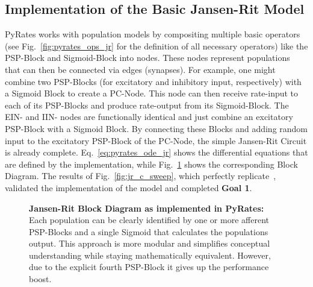 \subsection{Implementation of the Basic Jansen-Rit Model}\label{subsec:implementation-of-the-jansen-rit-model}
PyRates works with population models by compositing multiple basic operators
(see Fig.~\ref{fig:pyrates_ops_jr} for the definition of all necessary operators)
like the PSP-Block and Sigmoid-Block into nodes.
These nodes represent populations that can then be connected via edges (synapses).
For example, one might combine two PSP-Blocks (for excitatory and inhibitory input, respectively)
with a Sigmoid Block to create a PC-Node.
This node can then receive rate-input to each of its PSP-Blocks and produce rate-output from its Sigmoid-Block.
The EIN- and IIN- nodes are functionally identical and just combine an excitatory PSP-Block with a Sigmoid Block.
By connecting these Blocks and adding random input to the excitatory PSP-Block of the PC-Node,
the simple Jansen-Rit Circuit is already complete.
Eq.~\ref{eq:pyrates_ode_jr} shows the differential equations that are defined by the implementation,
while Fig.~\ref{fig:pyratesJRBlock} shows the corresponding Block Diagram.
The results of Fig.~\ref{fig:jr_c_sweep},
which perfectly replicate~\cite[Fig. 3]{jansen_electroencephalogram_1995},
validated the implementation of the model and completed \textbf{Goal 1}.

\begin{figure}[H]
    
    \caption{\textbf{Jansen-Rit Block Diagram as implemented in PyRates:} Each population can be
    clearly identified by one or more afferent PSP-Blocks and a
    single Sigmoid that calculates the populations output.
    This approach is more modular and simplifies conceptual understanding while staying mathematically equivalent.
    However, due to the explicit fourth PSP-Block it gives up the performance boost.
    }
    \label{fig:pyratesJRBlock}
\end{figure}


